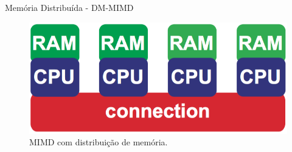 \begin{frame}{Memória Distribuída - DM-MIMD}
    \begin{figure}[h]
    	\centering
    	\includegraphics[width=1\textwidth]{img/tobias/dm-mimd.png}
    	\caption{MIMD com distribuição de memória.}
    	\label{fig:dm-mimd}
    \end{figure}

\end{frame}


%
%
%

